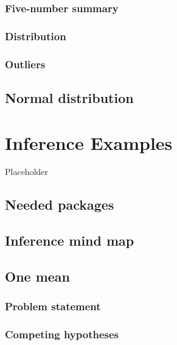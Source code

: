 \documentclass[12pt, krantz2,]{krantz}
\begin{document}
\hypertarget{five-number-summary}{%
\subsection{Five-number summary}\label{five-number-summary}}

\hypertarget{distribution}{%
\subsection{Distribution}\label{distribution}}

\hypertarget{outliers}{%
\subsection{Outliers}\label{outliers}}

\hypertarget{normal-curve}{%
\section{Normal distribution}\label{normal-curve}}

\hypertarget{appendixB}{%
\chapter{Inference Examples}\label{appendixB}}

Placeholder

\hypertarget{needed-packages-10}{%
\section*{Needed packages}\label{needed-packages-10}}


\hypertarget{inference-mind-map}{%
\section{Inference mind map}\label{inference-mind-map}}

\hypertarget{one-mean}{%
\section{One mean}\label{one-mean}}

\hypertarget{problem-statement}{%
\subsection{Problem statement}\label{problem-statement}}

\hypertarget{competing-hypotheses}{%
\subsection{Competing hypotheses}\label{competing-hypotheses}}
\end{document}
